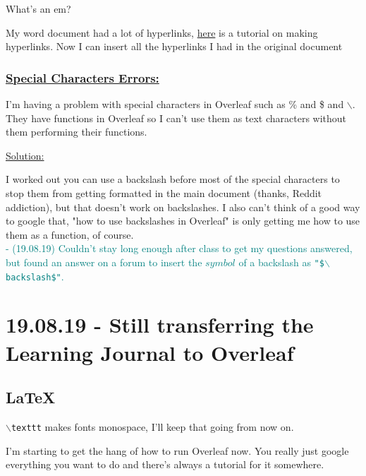 \documentclass[12pt]{article}
\begin{document}
What's an em? 

\color{black}
My word document had a lot of hyperlinks, 
\href{https://www.overleaf.com/learn/latex/Hyperlinks}{here} is a tutorial on making hyperlinks. Now I can insert all the hyperlinks I had in the original document

\subsubsection{\underline{Special Characters Errors:}}\label{error:er7}
\begin{addmargin}[1cm]{0cm}
I'm having a problem with special characters in Overleaf such as \% and \$ and $\backslash$. They have functions in Overleaf so I can't use them as text characters without them performing their functions.

\underline{Solution:}

I worked out you can use a backslash before most of the special characters to stop them from getting formatted in the main document (thanks, Reddit addiction), but that doesn't work on backslashes. I also can't think of a good way to google that, "how to use backslashes in Overleaf" is only getting me how to use them as a function, of course.
\\\textcolor{teal}{- (19.08.19) Couldn't stay long enough after class to get my questions answered, but found an answer on a forum to insert the $symbol$ of a backslash as \texttt{"\$$\backslash$backslash\$"}.}
\end{addmargin}

\section{19.08.19 - Still transferring the Learning Journal to Overleaf}
\subsection{LaTeX}

\texttt{$\backslash$texttt} makes fonts monospace, I'll keep that going from now on.

I'm starting to get the hang of how to run Overleaf now. You really just google everything you want to do and there's always a tutorial for it somewhere. 
\end{document}
